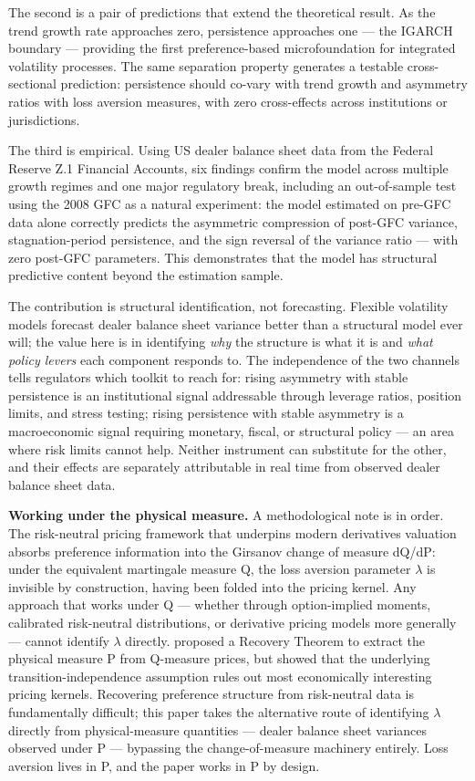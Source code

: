 \documentclass[12pt,a4paper]{article}
\theoremstyle{definition}
\begin{document}
The second is a pair of predictions that extend the theoretical result.
As the trend growth rate approaches zero, persistence approaches one ---
the IGARCH boundary --- providing the first preference-based
microfoundation for integrated volatility processes. The same separation
property generates a testable cross-sectional prediction: persistence
should co-vary with trend growth and asymmetry ratios with loss aversion
measures, with zero cross-effects across institutions or jurisdictions.

The third is empirical. Using US dealer balance sheet data from the
Federal Reserve Z.1 Financial Accounts, six findings confirm the model
across multiple growth regimes and one major regulatory break, including
an out-of-sample test using the 2008 GFC as a natural experiment: the
model estimated on pre-GFC data alone correctly predicts the asymmetric
compression of post-GFC variance, stagnation-period persistence, and the
sign reversal of the variance ratio --- with zero post-GFC parameters.
This demonstrates that the model has structural predictive content
beyond the estimation sample.

The contribution is structural identification, not forecasting. Flexible
volatility models forecast dealer balance sheet variance better than a
structural model ever will; the value here is in identifying \emph{why}
the structure is what it is and \emph{what policy levers} each component
responds to. The independence of the two channels tells regulators
which toolkit to reach for: rising asymmetry with stable persistence is
an institutional signal addressable through leverage ratios, position
limits, and stress testing; rising persistence with stable asymmetry is
a macroeconomic signal requiring monetary, fiscal, or structural policy
--- an area where risk limits cannot help. Neither instrument can
substitute for the other, and their effects are separately attributable
in real time from observed dealer balance sheet data.

\noindent\textbf{Working under the physical measure.} A methodological
note is in order. The risk-neutral pricing framework that underpins
modern derivatives valuation absorbs preference information into the
Girsanov change of measure dQ/dP: under the equivalent martingale
measure Q, the loss aversion parameter $\lambda$ is invisible by
construction, having been folded into the pricing kernel. Any approach
that works under Q --- whether through option-implied moments, calibrated
risk-neutral distributions, or derivative pricing models more
generally --- cannot identify $\lambda$ directly. \citet{ross2015}
proposed a Recovery Theorem to extract the physical measure P from
Q-measure prices, but \citet{borovicka2016} showed that the underlying
transition-independence assumption rules out most economically
interesting pricing kernels. Recovering preference structure from
risk-neutral data is fundamentally difficult; this paper takes the
alternative route of identifying $\lambda$ directly from
physical-measure quantities --- dealer balance sheet variances observed
under P --- bypassing the change-of-measure machinery entirely. Loss
aversion lives in P, and the paper works in P by design.
\end{document}
